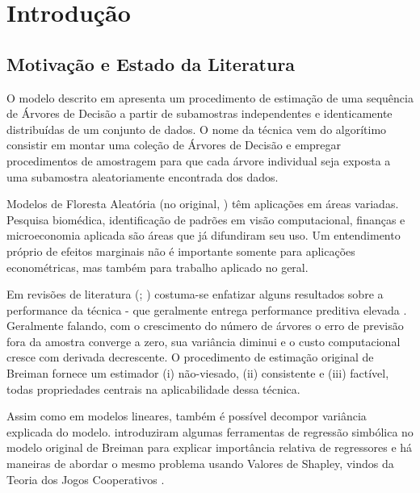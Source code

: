 

\chapter{Introdução}
\label{cap:intro} %
\section{Motivação e Estado da Literatura}

O modelo descrito em \cite{breiman2001random} apresenta um procedimento de estimação de uma sequência de Árvores de Decisão a partir de subamostras independentes e identicamente distribuídas de um conjunto de dados. O nome da técnica vem do algorítimo consistir em montar uma coleção de Árvores de Decisão e empregar procedimentos de amostragem para que cada árvore individual seja exposta a uma subamostra aleatoriamente encontrada dos dados.

Modelos de Floresta Aleatória (no original, ) têm aplicações em áreas variadas. Pesquisa biomédica, identificação de padrões em visão computacional, finanças e microeconomia aplicada são áreas que já difundiram seu uso. Um entendimento próprio de efeitos marginais não é importante somente para aplicações econométricas, mas também para trabalho aplicado no geral. 

Em revisões de literatura (\cite{siroky2009navigating}; \cite{biau2016random}) costuma-se enfatizar alguns resultados sobre a performance da técnica - que geralmente entrega performance preditiva elevada \citep{gu2018empirical}. Geralmente falando, com o crescimento do número de árvores o erro de previsão fora da amostra converge a zero, sua variância diminui e o custo computacional cresce com derivada decrescente. O procedimento de estimação original de Breiman fornece um estimador (i) não-viesado, (ii) consistente e (iii) factível, todas propriedades centrais na aplicabilidade dessa técnica. 

Assim como em modelos lineares, também é possível decompor variância explicada do modelo. \cite{stijven2011separating} introduziram algumas ferramentas de regressão simbólica no modelo original de Breiman para explicar importância relativa de regressores e há maneiras de abordar o mesmo problema usando Valores de Shapley, vindos da Teoria dos Jogos Cooperativos \citep{cohen2007feature}.

